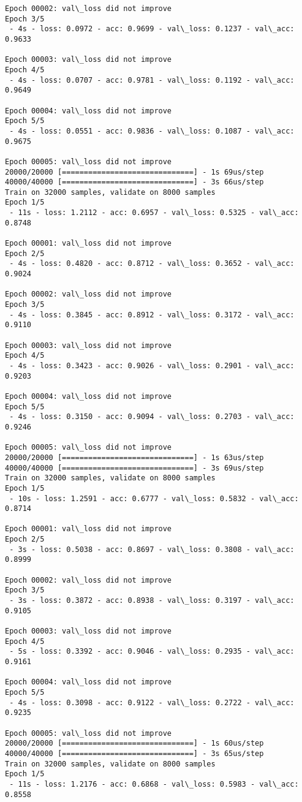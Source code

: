 \documentclass[11pt]{article}
\begin{document}
\begin{Verbatim}[commandchars=\\\{\}]
Epoch 00002: val\_loss did not improve
Epoch 3/5
 - 4s - loss: 0.0972 - acc: 0.9699 - val\_loss: 0.1237 - val\_acc: 0.9633

Epoch 00003: val\_loss did not improve
Epoch 4/5
 - 4s - loss: 0.0707 - acc: 0.9781 - val\_loss: 0.1192 - val\_acc: 0.9649

Epoch 00004: val\_loss did not improve
Epoch 5/5
 - 4s - loss: 0.0551 - acc: 0.9836 - val\_loss: 0.1087 - val\_acc: 0.9675

Epoch 00005: val\_loss did not improve
20000/20000 [==============================] - 1s 69us/step
40000/40000 [==============================] - 3s 66us/step
Train on 32000 samples, validate on 8000 samples
Epoch 1/5
 - 11s - loss: 1.2112 - acc: 0.6957 - val\_loss: 0.5325 - val\_acc: 0.8748

Epoch 00001: val\_loss did not improve
Epoch 2/5
 - 4s - loss: 0.4820 - acc: 0.8712 - val\_loss: 0.3652 - val\_acc: 0.9024

Epoch 00002: val\_loss did not improve
Epoch 3/5
 - 4s - loss: 0.3845 - acc: 0.8912 - val\_loss: 0.3172 - val\_acc: 0.9110

Epoch 00003: val\_loss did not improve
Epoch 4/5
 - 4s - loss: 0.3423 - acc: 0.9026 - val\_loss: 0.2901 - val\_acc: 0.9203

Epoch 00004: val\_loss did not improve
Epoch 5/5
 - 4s - loss: 0.3150 - acc: 0.9094 - val\_loss: 0.2703 - val\_acc: 0.9246

Epoch 00005: val\_loss did not improve
20000/20000 [==============================] - 1s 63us/step
40000/40000 [==============================] - 3s 69us/step
Train on 32000 samples, validate on 8000 samples
Epoch 1/5
 - 10s - loss: 1.2591 - acc: 0.6777 - val\_loss: 0.5832 - val\_acc: 0.8714

Epoch 00001: val\_loss did not improve
Epoch 2/5
 - 3s - loss: 0.5038 - acc: 0.8697 - val\_loss: 0.3808 - val\_acc: 0.8999

Epoch 00002: val\_loss did not improve
Epoch 3/5
 - 3s - loss: 0.3872 - acc: 0.8938 - val\_loss: 0.3197 - val\_acc: 0.9105

Epoch 00003: val\_loss did not improve
Epoch 4/5
 - 5s - loss: 0.3392 - acc: 0.9046 - val\_loss: 0.2935 - val\_acc: 0.9161

Epoch 00004: val\_loss did not improve
Epoch 5/5
 - 4s - loss: 0.3098 - acc: 0.9122 - val\_loss: 0.2722 - val\_acc: 0.9235

Epoch 00005: val\_loss did not improve
20000/20000 [==============================] - 1s 60us/step
40000/40000 [==============================] - 3s 65us/step
Train on 32000 samples, validate on 8000 samples
Epoch 1/5
 - 11s - loss: 1.2176 - acc: 0.6868 - val\_loss: 0.5983 - val\_acc: 0.8558


\end{Verbatim}
\end{document}
